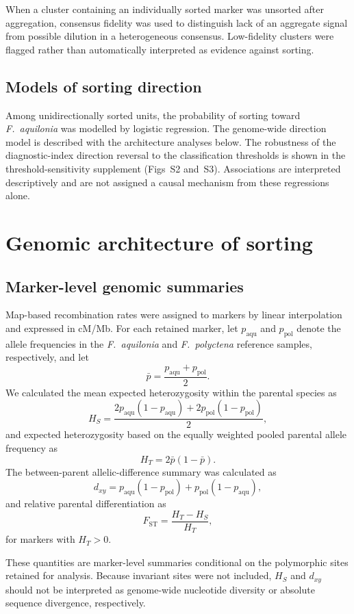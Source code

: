 \documentclass[11pt]{article}
\newcommand{\Faq}{\textit{F.~aquilonia}}
\newcommand{\Fpo}{\textit{F.~polyctena}}
\begin{document}
When a cluster containing an individually sorted marker was unsorted after
aggregation, consensus fidelity was used to distinguish lack of an aggregate
signal from possible dilution in a heterogeneous consensus. Low-fidelity
clusters were flagged rather than automatically interpreted as evidence against
sorting.

\subsection{Models of sorting direction}

Among unidirectionally sorted units, the probability of sorting toward \Faq{}
was modelled by logistic regression. The genome-wide direction model is
described with the architecture analyses below. The robustness of the
diagnostic-index direction reversal to the classification thresholds is shown in
the threshold-sensitivity supplement (Figs~S2 and~S3). Associations are
interpreted descriptively and are not assigned a causal mechanism from these
regressions alone.

\section{Genomic architecture of sorting}

\subsection{Marker-level genomic summaries}

Map-based recombination rates were assigned to markers by linear interpolation and expressed in cM/Mb. For each retained marker, let \(p_{\mathrm{aqu}}\) and \(p_{\mathrm{pol}}\) denote the allele frequencies in the \Faq{} and \Fpo{} reference samples, respectively, and let
\[
\bar p=\frac{p_{\mathrm{aqu}}+p_{\mathrm{pol}}}{2}.
\]
We calculated the mean expected heterozygosity within the parental species as
\[
H_S=
\frac{
2p_{\mathrm{aqu}}(1-p_{\mathrm{aqu}})
+
2p_{\mathrm{pol}}(1-p_{\mathrm{pol}})
}{2},
\]
and expected heterozygosity based on the equally weighted pooled parental allele frequency as
\[
H_T=2\bar p(1-\bar p).
\]
The between-parent allelic-difference summary was calculated as
\[
d_{xy}
=
p_{\mathrm{aqu}}(1-p_{\mathrm{pol}})
+
p_{\mathrm{pol}}(1-p_{\mathrm{aqu}}),
\]
and relative parental differentiation as
\[
F_{\mathrm{ST}}=\frac{H_T-H_S}{H_T},
\]
for markers with \(H_T>0\).

These quantities are marker-level summaries conditional on the polymorphic sites retained for analysis. Because invariant sites were not included, \(H_S\) and \(d_{xy}\) should not be interpreted as genome-wide nucleotide diversity or absolute sequence divergence, respectively.
\end{document}

